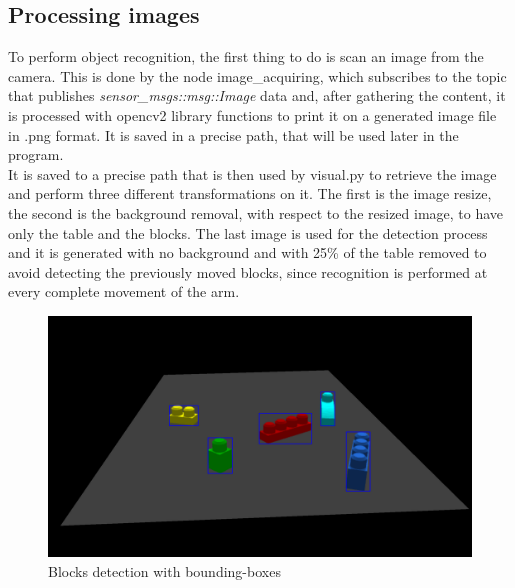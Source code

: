 \documentclass[12pt,a4paper]{article}
\begin{document}
\subsection{Processing images}\label{subsec:imageproc}
To perform object recognition, the first thing to do is scan an image from the camera. This is done by the node image\_acquiring, which subscribes to the topic that publishes \textit{sensor\_msgs::msg::Image} data and, after gathering the content, it is processed with opencv2 library functions to print it on a generated image file in .png format. It is saved in a precise path, that will be used later in the program.\\It is saved to a precise path that is then used by visual.py to retrieve the image and perform three different transformations on it. The first is the image resize, the second is the background removal, with respect to the resized image, to have only the table and the blocks. The last image is used for the detection process and it is generated with no background and with 25\% of the table removed to avoid detecting the previously moved blocks, since recognition is performed at every complete movement of the arm.
\begin{center}
    \begin{figure}
        \centering
        \includegraphics[width=1.0\columnwidth]{images/Yolo1.png}
        \caption{Blocks detection with bounding-boxes}
        \label{fig:yolo1}
    \end{figure}
\end{center}
\end{document}
